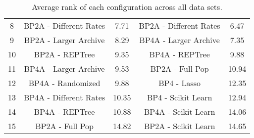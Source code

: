 \begin{table*}[ht]
\begin{adjustbox}{width=1\textwidth}
\begin{tabular}{ c | c c | c c }
8 & BP2A - Different Rates & 7.71 & BP2A - Different Rates & 6.47 \\
9 & BP2A - Larger Archive & 8.29 & BP4A - Larger Archive & 7.35 \\
10 & BP2A - REPTree & 9.35 & BP4A - REPTree & 9.88 \\
11 & BP4A - Larger Archive & 9.53 & BP2A - Full Pop & 10.94 \\
12 & BP4A - Randomized & 9.88 & BP4 - Lasso & 12.35 \\
13 & BP4A - Different Rates & 10.35 & BP4 - Scikit Learn & 12.94 \\
14 & BP4A - REPTree & 10.88 & BP4A - Scikit Learn & 14.06 \\
15 & BP2A - Full Pop & 14.82 & BP2A - Scikit Learn & 14.65 \\
\hline
\end{tabular}
\end{adjustbox}
\caption{Average rank of each configuration across all data sets.}
\label{table:ranks}
\end{table*}

